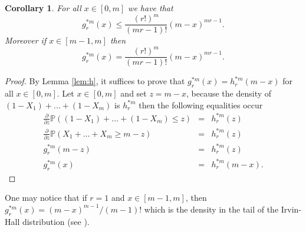 \documentclass{article}
\theoremstyle{plain}
\newtheorem{corollary}[theorem]{Corollary}
\renewcommand{\P}{{\mathbb P}}
\begin{document}
\begin{corollary}
\label{cor:tail}
For all $x\in [0,m]$ we have that
\[g_r^{*m}(x)\le \frac{(r!)^m}{(mr-1)!}(m-x)^{mr-1}.\]
Moreover if $x\in [m-1,m]$ then 
\[g_r^{*m}(x)=\frac{(r!)^m}{(mr-1)!}(m-x)^{mr-1}.\]
\end{corollary}
\begin{proof}
By Lemma \ref{lem:h}, it  suffices to prove that $g_r^{*m}(x)=h_r^{*m}(m-x)$ for all $x\in[0,m]$.
Let $x\in [0,m]$ and set $z=m-x$, because the density of $(1-X_1)+\dots +(1-X_m)$ is
 $h_r^{*m}$  then the  following equalities occur
\begin{eqnarray*}
\frac{\partial}{\partial z}\P((1-X_1)+\dots +(1-X_m)\le z) &=& h_r^{*m}(z)\\
\frac{\partial}{\partial z}\P(X_1+\dots+X_m\ge m-z) &=& h_r^{*m}(z)\\
g_r^{*m}(m-z) &=& h_r^{*m}(z)\\
g_r^{*m}(x) &=& h_r^{*m}(m-x).
\end{eqnarray*}
\end{proof}


One may notice that if $r=1$ and $x\in [m-1,m]$, then $g_r^{*m}(x)=(m-x)^{m-1}/(m-1)!$ which is the density in the tail of the Irvin-Hall distribution (see \cite{hall1927distribution,irwin1927frequency}). 
\end{document}
